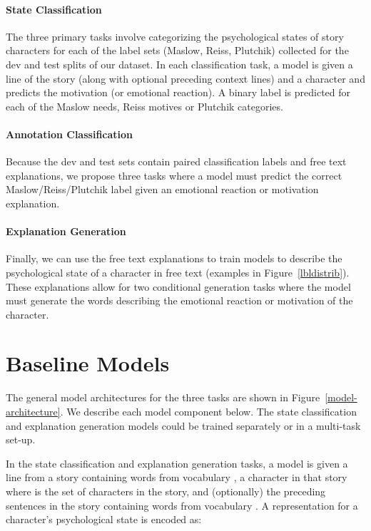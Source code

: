 \documentclass[11pt,a4paper]{article}
\begin{document}
\paragraph{State Classification} The three primary tasks involve categorizing the psychological states of story characters for each of the label sets (Maslow, Reiss, Plutchik) collected for the dev and test splits of our dataset. In each classification task, a model is given a line of the story (along with optional preceding context lines) and a character and predicts the motivation (or emotional reaction). A binary label is predicted for each of the Maslow needs, Reiss motives or Plutchik categories.
\vspace{-1mm}
\paragraph{Annotation Classification} Because the dev and test sets contain paired classification labels and free text explanations, we propose three tasks where a model must predict the correct Maslow/Reiss/Plutchik label given an emotional reaction or motivation explanation.
\vspace{-1mm}
\paragraph{Explanation Generation} Finally, we can use the free text explanations to train models to describe the psychological state of a character in free text (examples in Figure~\ref{lbldistrib}). These explanations allow for two conditional generation tasks where the model must generate the words describing the emotional reaction or motivation of the character.

 \section{Baseline Models}
The general model architectures for the three tasks are shown in Figure~\ref{model-architecture}.  We describe each model component below.  The state classification and explanation generation models could be trained separately or in a multi-task set-up.

In the state classification and explanation generation tasks, a model is given a line from a story  containing  words  from vocabulary , a character in that story  where  is the set of characters in the story, and (optionally) the preceding sentences in the story  containing words from vocabulary . A representation for a character's psychological state is encoded as:
\vspace*{-1mm}
\end{document}
